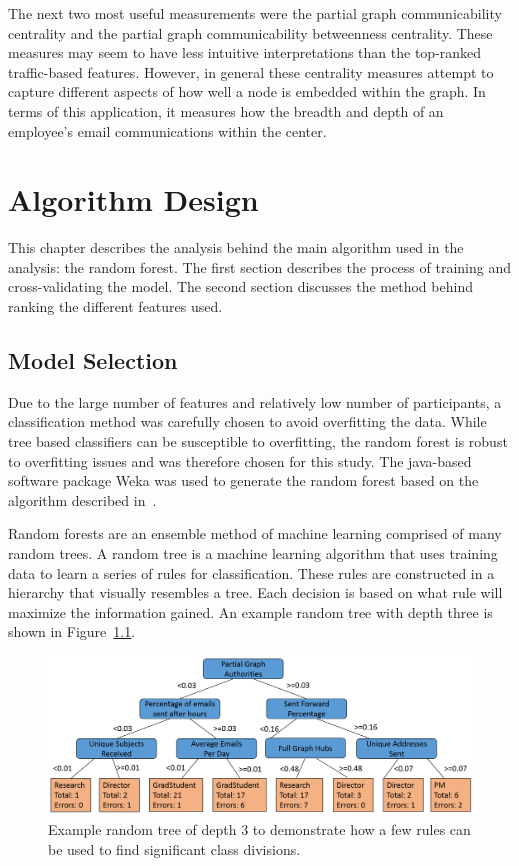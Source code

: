 \documentclass[12pt]{report}
\begin{document}
The next two most useful measurements were the partial graph communicability centrality and the partial graph communicability betweenness centrality.
These measures may seem to have less intuitive interpretations than the top-ranked traffic-based features.
However, in general these centrality measures attempt to capture different aspects of how well a node is embedded within the graph.
In terms of this application, it measures how the breadth and depth of an employee's email communications within the center.

\chapter{Algorithm Design} \label{Algorithm}
This chapter describes the analysis behind the main algorithm used in the analysis: the random forest.
The first section describes the process of training and cross-validating the model.
The second section discusses the method behind ranking the different features used.

\section{Model Selection}
Due to the large number of features and relatively low number of participants, a classification method was carefully chosen to avoid overfitting the data.
While tree based classifiers can be susceptible to overfitting, the random forest is robust to overfitting issues and was therefore chosen for this study.
The java-based software package Weka was used to generate the random forest based on the algorithm described in~\cite{Breiman2001}.

Random forests are an ensemble method of machine learning comprised of many random trees.
A random tree is a machine learning algorithm that uses training data to learn a series of rules for classification.
These rules are constructed in a hierarchy that visually resembles a tree.
Each decision is based on what rule will maximize the information gained.
An example random tree with depth three is shown in Figure~\ref{fig:ex_tree}.

\begin{figure}[t]
    \centering
    \includegraphics[width=\columnwidth,trim={0mm 2.5mm 0mm 2mm},clip]{3_level_tree}
    \vspace{-15pt}
    \caption[Example random tree]{Example random tree of depth 3 to demonstrate how a few rules can be used to find significant class divisions.}
    \label{fig:ex_tree}
\end{figure}
\end{document}
